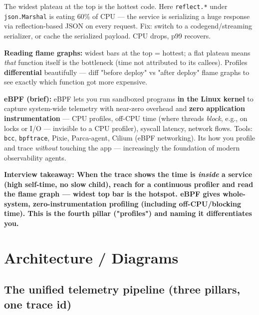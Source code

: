 \documentclass[11pt]{article}
\begin{document}
The widest plateau at the top is the hottest code. Here \texttt{reflect.*} under \texttt{json.Marshal} is eating 60\% of CPU --- the service is serializing a huge response via reflection-based JSON on every request. Fix: switch to a codegen\textquotesingle d/streaming serializer, or cache the serialized payload. CPU drops, p99 recovers.

\textbf{Reading flame graphs:} widest bars at the top = hottest; a flat plateau means \emph{that} function itself is the bottleneck (time not attributed to its callees). Profiles \textbf{differential} beautifully --- diff "before deploy" vs "after deploy" flame graphs to see exactly which function got more expensive.

\textbf{eBPF (brief):} eBPF lets you run sandboxed programs \textbf{in the Linux kernel} to capture system-wide telemetry with near-zero overhead and \textbf{zero application instrumentation} --- CPU profiles, off-CPU time (where threads \emph{block}, e.g., on locks or I/O --- invisible to a CPU profiler), syscall latency, network flows. Tools: \texttt{bcc}, \texttt{bpftrace}, Pixie, Parca-agent, Cilium (eBPF networking). It\textquotesingle s how you profile and trace \emph{without} touching the app --- increasingly the foundation of modern observability agents.

\textbf{Interview takeaway: When the trace shows the time is \emph{inside} a service (high self-time, no slow child), reach for a continuous profiler and read the flame graph --- widest top bar is the hotspot. eBPF gives whole-system, zero-instrumentation profiling (including off-CPU/blocking time). This is the fourth pillar ("profiles") and naming it differentiates you.}

\section{Architecture / Diagrams}\label{architecture--diagrams}

\subsection{The unified telemetry pipeline (three pillars, one trace id)}\label{the-unified-telemetry-pipeline-three-pillars-one-trace-id}

\setcodelang{}
\end{document}
